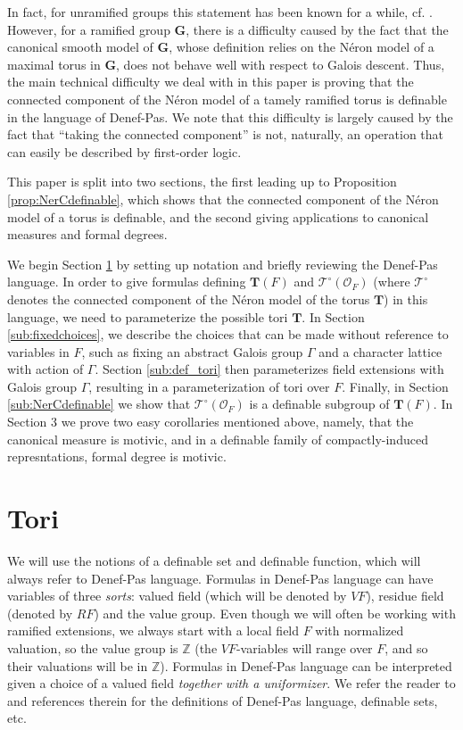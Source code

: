 \documentclass{amsart}
\newcommand{\Z}{{\mathbb Z}}
\newcommand{\ri}{\mathcal{O}}
\newcommand{\bG}{\mathbf{G}}
\newcommand{\bT}{\mathbf {T}}
\newcommand{\NerC}[1]{\mathcal{#1}^\circ}
\theoremstyle{plain}
\theoremstyle{definition}
\begin{document}
In fact, for unramified groups this statement has been known for a while, cf. \cite{cluckers-hales-loeser}. However, for a ramified group $\bG$, there is a difficulty caused by the fact that the canonical smooth model of $\bG$, whose definition relies on the N\'eron model of a maximal torus in $\bG$, does not behave well with respect to Galois descent. Thus, the main technical difficulty we deal with in this paper is proving that the connected component of the N\'eron model of a tamely ramified torus is definable in the language of Denef-Pas. We note that this difficulty is largely caused by the fact that ``taking the connected component'' is not, naturally, an operation that can easily be described by first-order logic. 

This paper is split into two sections, the first leading up to Proposition \ref{prop:NerCdefinable},
which shows that the connected component of the N\'eron model of a torus is definable,
and the second giving applications to canonical measures and formal degrees.

We begin Section \ref{sec:tori} by setting up notation and briefly reviewing the Denef-Pas language.  In order
to give formulas defining $\bT(F)$ and $\NerC{T}(\ri_F)$  (where $\NerC{T}$ denotes the connected component of the N\'eron model of the torus $\bT$) in this language, we need to parameterize the possible tori $\bT$.
In Section \ref{sub:fixedchoices}, we describe the choices that can be made without reference to variables in $F$,
such as fixing an abstract Galois group $\Gamma$ and a character lattice with action of $\Gamma$.
Section \ref{sub:def_tori} then parameterizes field extensions with Galois group $\Gamma$, resulting in a parameterization
of tori over $F$.  Finally, in Section \ref{sub:NerCdefinable} we show that $\NerC{T}(\ri_F)$ is a definable subgroup of $\bT(F)$.
In Section 3 we prove two easy corollaries mentioned above, namely, that the canonical measure is motivic, and in a definable family of compactly-induced represntations, formal degree is motivic. 

\section{Tori} \label{sec:tori}
We will use the notions of a definable set and definable function, which will always refer to Denef-Pas language. 
Formulas in Denef-Pas language can have variables of three \emph{sorts}: valued field (which will be denoted by $VF$), residue field (denoted by $RF$) and the value group. Even though we will often be working with ramified extensions, we always start with a local field $F$ with normalized valuation, so the value group is $\Z$ (the $VF$-variables will range over $F$, and so their valuations will be in $\Z$).
Formulas in Denef-Pas language can be interpreted given a choice of a valued field \emph{together with a uniformizer}. 
We refer the reader to \cite{CGH-ad}  and references therein for the definitions of Denef-Pas language, definable sets, etc. 
\end{document}
